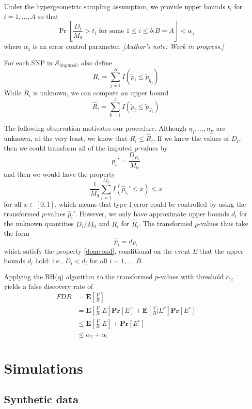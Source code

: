 \documentclass[12pt]{article}
\begin{document}
Under the hypergeometric sampling assumption,
we provide upper bounds $t_i$
for $i=1,\hdots,A$
so that
\[
\Pr[\frac{D_i}{M_0} > t_i \text{ for some }1 \leq i \leq b|B=A] < \alpha_1
\]
where $\alpha_1$ is an error control parameter.
\emph{[Author's note: Work in progress.]}

For each SNP in $\mathcal{S}_{imputed}$,
also define
\[
R_i = \sum_{j=1}^B I(\tilde{p}_i \leq \tilde{p}_{\eta_j})
\]
While $R_i$ is unknown, we can compute an upper bound
\[
\hat{R}_i = \sum_{k=1}^A I(\tilde{p}_i \leq \tilde{p}_{J_k})
\]

The following observation motivates our procedure.
Although $\eta_1,\hdots,\eta_B$ are unknown,
at the very least, we know that $R_i \leq \hat{R}_i$.
If we knew the values of $D_i$,
then we could transform all of the imputed p-values by
\[
\hat{p}_i' = \frac{D_{R_i}}{M_0}
\]
and then we would have the property
\[
\frac{1}{M_0}\sum_{i=1}^{M_0} I(\hat{p}_{\iota_i}' \leq x) \leq x
\]
for all $x \in [0,1]$,
which means that type I error could be controlled by
using the transformed $p$-values $\hat{p}_i'$.
However, we only have approximate upper bounds $d_i$ for the unknown quantities
$D_i/M_0$
and $R_i$ for $\hat{R}_i$.
The transformed $p$-values thus take the form
\[
\hat{p}_i = d_{R_i}
\]
which satisfy the property \eqref{domcond},
conditional on the event $E$ that the upper bounds $d_i$ hold:
i.e., $D_i < d_i$ for all $i=1,\hdots,B$.

Applying the BH(q) algorithm to the transformed $p$-values
with threshold $\alpha_2$ yields a false discovery rate of
\begin{align*}
FDR &= \mathbf{E}\left[\frac{V}{R}\right] 
\\& =  \mathbf{E}\left[\frac{V}{R} | E\right]\mathbf{Pr}[E] 
+  \mathbf{E}\left[\frac{V}{R} | E^c\right]\mathbf{Pr}[E^c]
\\&\leq  \mathbf{E}\left[\frac{V}{R} | E\right]+ \mathbf{Pr}[E^c]
\\&\leq \alpha_2 + \alpha_1
\end{align*}




\section{Simulations}

\subsection{Synthetic data}
\end{document}
